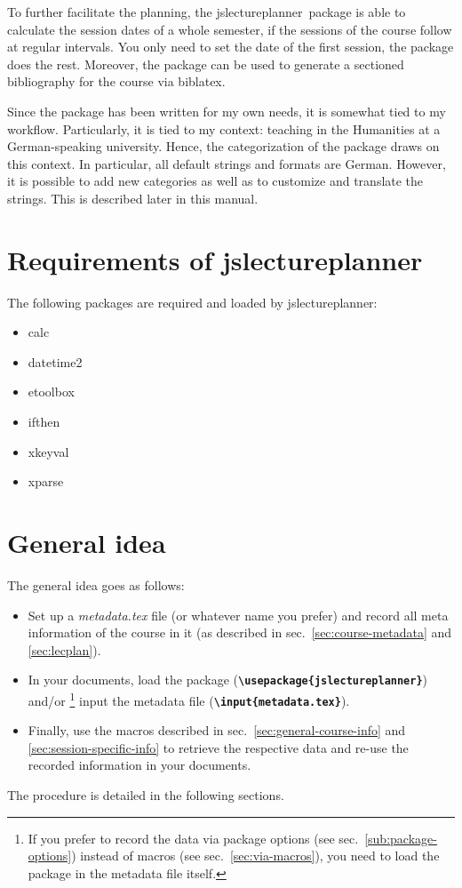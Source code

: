 \documentclass[english]{article}
\newcommand*\jmacro[1]{\textbf{\texttt{#1}}}
\newcommand*\jcsmacro[1]{\jmacro{\textbackslash{#1}}}
\newcommand*\jslp{\textsf{jslectureplanner}}
\begin{document}
To further facilitate the planning, the \jslp\ package
is able to calculate the session dates of a whole semester, if the sessions
of the course follow at regular intervals.
You only need to set the date of the first session, the package does
the rest. Moreover, the package can be used to generate a sectioned
bibliography for the course via \textsf{biblatex}.

Since the package has been written for my own needs, it is somewhat tied
to my workflow. Particularly, it is tied to my context: teaching in
the Humanities at a German-speaking university. Hence, the categorization
of the package draws on this context. In particular, all default strings and
formats are German. However, it is possible to add new categories as
well as to customize and translate the strings.
This is described later in this manual.

\section{Requirements of \jslp}\label{sec:req-jslp}

The following packages are required and loaded by \jslp:
\begin{itemize}
 \setlength\itemsep{2pt}
 \item \textsf{calc}
 \item \textsf{datetime2}
 \item \textsf{etoolbox}
 \item \textsf{ifthen}
 \item \textsf{xkeyval}
 \item \textsf{xparse}
\end{itemize}
\pagebreak

\section{General idea}

The general idea goes as follows:
\begin{itemize}
\item Set up a \emph{metadata.tex} file (or whatever name you prefer) and
record all meta information of the course in it (as described in sec.~\ref{sec:course-metadata}
and \ref{sec:lecplan}).
\item In your documents, load the package (\jcsmacro{usepackage\{jslectureplanner\}})
and/or%
\footnote{If you prefer to record the data via package options
(see sec.~\ref{sub:package-options}) instead of macros (see sec.~\ref{sec:via-macros}),
you need to load the package in the metadata file itself.}
 input the metadata file (\jcsmacro{input\{metadata.tex\}}).
\item Finally, use the macros described in sec.~\ref{sec:general-course-info}
and \ref{sec:session-specific-info} to retrieve the respective data and re-use
the recorded information in your documents.
\end{itemize}
The procedure is detailed in the following sections.
\end{document}
